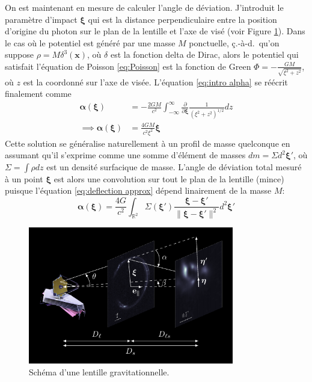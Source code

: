 On est maintenant en mesure de calculer l'angle de déviation. 
J'introduit le paramètre d'impact $\boldsymbol{\xi}$ qui est la distance perpendiculaire entre 
la position d'origine du photon sur le plan de la lentille  
et l'axe de visé (voir Figure \ref{fig:cartoon}).
Dans le cas où le potentiel est généré par une masse $M$ ponctuelle, ç.-à-d.\ qu'on 
suppose $\rho = M\delta^{3}(\mathbf{x})$, où $\delta $ est la fonction delta de Dirac, 
alors le potentiel qui satisfait l'équation de Poisson \eqref{eq:Poisson} est 
la fonction de Green 
$\displaystyle \Phi = -\frac{GM}{\sqrt{ \xi^{2} + z^{2}}}$, où $z$ est la coordonné 
sur l'axe de visée. L'équation \eqref{eq:intro alpha} se réécrit finalement comme 
\begin{align}
\nonumber
        \boldsymbol{ \alpha}(\boldsymbol{ \xi} ) &= -\frac{2GM}{c^{2}} \int_{-\infty }^{\infty }  \frac{\partial}{\partial \boldsymbol{\xi} }\frac{1}{(\xi^{2} + z^{2})^{1/2}}dz \\
\label{eq:deflection approx}
        \implies \boldsymbol{ \alpha}(\boldsymbol{ \xi})  &= \frac{4GM}{c^{2}  \xi^{2} } \boldsymbol{ \xi}
\end{align} 
Cette solution se généralise naturellement à un profil de masse quelconque en assumant 
qu'il s'exprime comme une somme d'élément de masses $dm = \Sigma d^{2}\boldsymbol{ \xi}'$, 
où $\Sigma = \int \rho dz$ est un densité surfacique de masse. 
L'angle de déviation total mesuré à un point $\boldsymbol{\xi} $ est alors une convolution 
sur tout le plan de la lentille (mince) puisque l'équation \eqref{eq:deflection approx} dépend 
linairement de la masse $M$:
\begin{equation}\label{eq:alpha physique}
        \boldsymbol{ \alpha} (\boldsymbol{ \xi} ) = \frac{4 G}{c^{2}} 
        \int_{\mathbb{R}^{2}} \Sigma (\boldsymbol{ \xi} ')
        \frac{\boldsymbol{ \xi}  - \boldsymbol{ \xi} '}{\lVert \boldsymbol{ \xi}  - \boldsymbol{ \xi} ' \rVert^{2}}d^{2}\boldsymbol{ \xi} '
\end{equation} 

\begin{figure}[tb!]
        \centering
        \includegraphics[width=0.8\textwidth]{figures/lensing_cartoon}
        \caption{Schéma d'une lentille gravitationnelle.}
        \label{fig:cartoon}
\end{figure}

